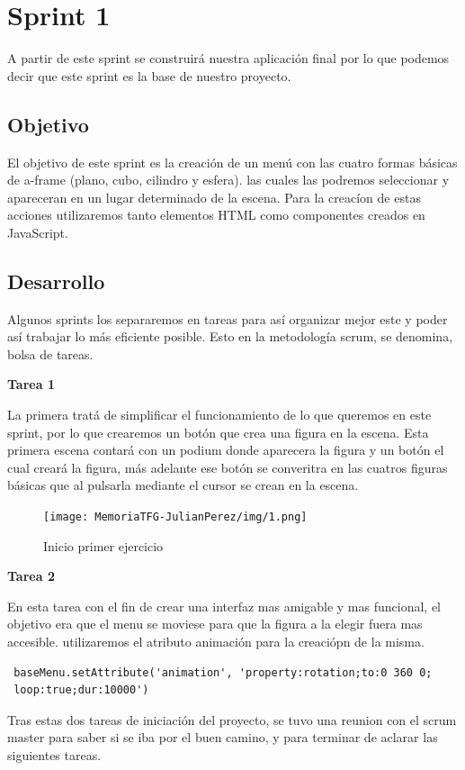 \documentclass[a4paper, 12pt]{book}
\begin{document}
\section{Sprint 1}
A partir de este sprint se construirá nuestra aplicación final por lo que podemos decir que este sprint es la base de nuestro proyecto. 
\subsection{Objetivo}
El objetivo de este sprint es la creación de un menú con las cuatro formas básicas de a-frame (plano, cubo, cilindro y esfera). las cuales las podremos seleccionar y apareceran en un lugar determinado de la escena. Para la creacíon de estas acciones utilizaremos tanto elementos HTML como componentes creados en JavaScript.

\subsection{Desarrollo}
Algunos sprints los separaremos en tareas para así organizar mejor este y poder así trabajar lo más eficiente posible. Esto en la metodología scrum, se denomina, bolsa de tareas.

\textbf{Tarea 1}

La primera tratá de simplificar el funcionamiento de lo que queremos en este sprint, por lo que crearemos un botón que crea una figura en la escena. 
Esta primera escena contará con un podium donde aparecera la figura y un botón el cual creará la figura, más adelante ese botón se converitra en las cuatros figuras básicas que al pulsarla mediante el cursor se crean en la escena.
         \begin{figure}[H]
  \centering
  \texttt{[image: MemoriaTFG-JulianPerez/img/1.png]}
  \caption{Inicio primer ejercicio}\label{scrum}
\end{figure}

\textbf{Tarea 2}

En esta tarea con el fin de crear una interfaz mas amigable y mas funcional, el objetivo era que el menu se moviese para que la figura a la elegir fuera mas accesible. utilizaremos el atributo animación para la creaciópn de la misma.
\begin{verbatim}
 baseMenu.setAttribute('animation', 'property:rotation;to:0 360 0;
 loop:true;dur:10000')   
\end{verbatim}

Tras estas dos tareas de iniciación del proyecto, se tuvo una reunion con el scrum master para saber si se iba por el buen camino, y para terminar de aclarar las siguientes tareas.
\end{document}
